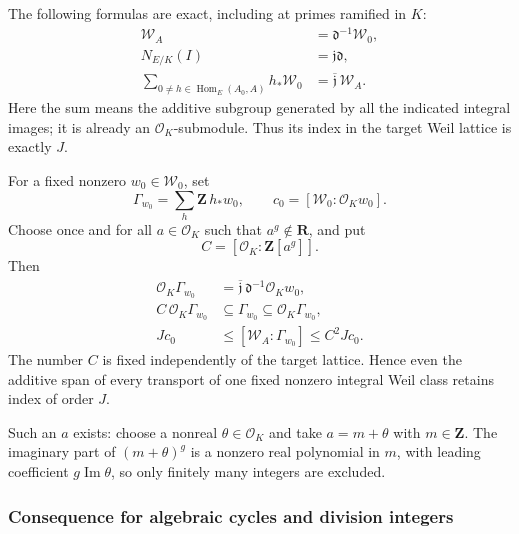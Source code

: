 \documentclass[11pt,a4paper]{article}
\theoremstyle{definition}
\begin{document}
The following formulas are exact, including at primes ramified in \(K\): \[
 \begin{aligned}
 \mathscr W_A&=\mathfrak d^{-1}\mathscr W_0,\\
 N_{E/K}(I)&=\mathfrak j\mathfrak d,\\
 \sum_{0\ne h\in\operatorname{Hom}_E(A_0,A)}h_*\mathscr W_0
 &=\overline{\mathfrak j}\,\mathscr W_A.
 \end{aligned}
\tag{B23.3}
\] Here the sum means the additive subgroup generated by all the indicated integral images; it is already an \(\mathcal O_K\)-submodule. Thus its index in the target Weil lattice is exactly \(J\).

For a fixed nonzero \(w_0\in\mathscr W_0\), set \[
 \Gamma_{w_0}=\sum_{h}\mathbf Z\,h_*w_0,
 \qquad
 c_0=[\mathscr W_0:\mathcal O_Kw_0].
\] Choose once and for all \(a\in\mathcal O_K\) such that \(a^g\notin\mathbf R\), and put \[
 C=[\mathcal O_K:\mathbf Z[a^g]].
\tag{B23.4}
\] Then \[
 \begin{aligned}
 \mathcal O_K\Gamma_{w_0}
 &=\overline{\mathfrak j}\,\mathfrak d^{-1}\mathcal O_Kw_0,\\
 C\,\mathcal O_K\Gamma_{w_0}
 &\subseteq\Gamma_{w_0}
 \subseteq\mathcal O_K\Gamma_{w_0},\\
 Jc_0&\le[\mathscr W_A:\Gamma_{w_0}]\le C^2Jc_0.
 \end{aligned}
\tag{B23.5}
\] The number \(C\) is fixed independently of the target lattice. Hence even the additive span of every transport of one fixed nonzero integral Weil class retains index of order \(J\).

Such an \(a\) exists: choose a nonreal \(\theta\in\mathcal O_K\) and take \(a=m+\theta\) with \(m\in\mathbf Z\). The imaginary part of \((m+\theta)^g\) is a nonzero real polynomial in \(m\), with leading coefficient \(g\operatorname{Im}\theta\), so only finitely many integers are excluded.

\subsubsection{Consequence for algebraic cycles and division integers}\label{consequence-for-algebraic-cycles-and-division-integers}
\end{document}
